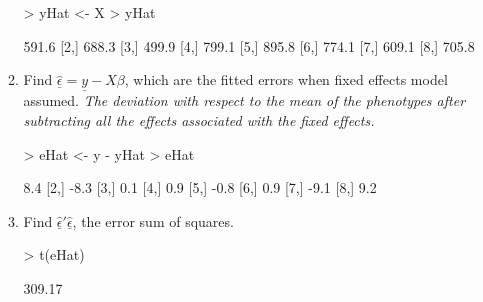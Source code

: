 \documentclass[12pt,a4paper]{paper}
\begin{document}
\begin{enumerate}
\begin{enumerate}
\begin{Schunk}
\begin{Sinput}
> yHat <- X %*% betaHat
> yHat
\end{Sinput}
\begin{Soutput}
      [,1]
[1,] 591.6
[2,] 688.3
[3,] 499.9
[4,] 799.1
[5,] 895.8
[6,] 774.1
[7,] 609.1
[8,] 705.8
\end{Soutput}
\end{Schunk}
\item Find $\underline{\hat{\epsilon}} = \underline{y} - X\beta$, which are the fitted errors when fixed effects model assumed. \textit{The deviation with respect to the mean of the phenotypes after subtracting all the effects associated with the fixed effects.}
\begin{Schunk}
\begin{Sinput}
> eHat <- y - yHat
> eHat
\end{Sinput}
\begin{Soutput}
     [,1]
[1,]  8.4
[2,] -8.3
[3,]  0.1
[4,]  0.9
[5,] -0.8
[6,]  0.9
[7,] -9.1
[8,]  9.2
\end{Soutput}
\end{Schunk}
\item Find $\underline{\hat{\epsilon}}'\underline{\hat{\epsilon}}$, the error sum of squares.
\begin{Schunk}
\begin{Sinput}
> t(eHat) %*% eHat
\end{Sinput}
\begin{Soutput}
       [,1]
[1,] 309.17
\end{Soutput}
\end{Schunk}
\end{enumerate}

\end{enumerate}
\end{document}
